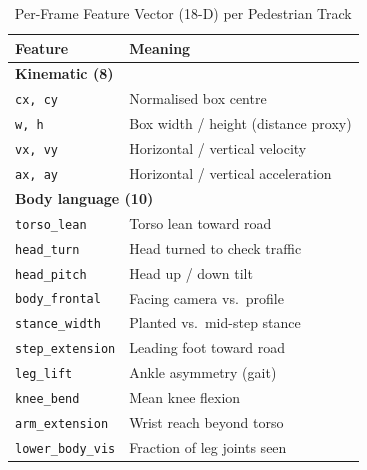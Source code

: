 \documentclass[conference]{IEEEtran}
\begin{document}
\begin{table}[H]
    \centering
    \small
    \setlength{\tabcolsep}{4pt}
    \renewcommand{\arraystretch}{1.1}
    \caption{Per-Frame Feature Vector (18-D) per Pedestrian Track}
    \label{tab:features}
    \begin{tabular}{|l|p{4.4cm}|}
        \hline
        \textbf{Feature} & \textbf{Meaning} \\ \hline
        \multicolumn{2}{|l|}{\textbf{Kinematic (8)}} \\ \hline
        \texttt{cx, cy} & Normalised box centre \\ \hline
        \texttt{w, h}   & Box width / height (distance proxy) \\ \hline
        \texttt{vx, vy} & Horizontal / vertical velocity \\ \hline
        \texttt{ax, ay} & Horizontal / vertical acceleration \\ \hline
        \multicolumn{2}{|l|}{\textbf{Body language (10)}} \\ \hline
        \texttt{torso\_lean}      & Torso lean toward road \\ \hline
        \texttt{head\_turn}       & Head turned to check traffic \\ \hline
        \texttt{head\_pitch}      & Head up / down tilt \\ \hline
        \texttt{body\_frontal}    & Facing camera vs.\ profile \\ \hline
        \texttt{stance\_width}    & Planted vs.\ mid-step stance \\ \hline
        \texttt{step\_extension}  & Leading foot toward road \\ \hline
        \texttt{leg\_lift}        & Ankle asymmetry (gait) \\ \hline
        \texttt{knee\_bend}       & Mean knee flexion \\ \hline
        \texttt{arm\_extension}   & Wrist reach beyond torso \\ \hline
        \texttt{lower\_body\_vis} & Fraction of leg joints seen \\ \hline
    \end{tabular}
\end{table}
\end{document}
